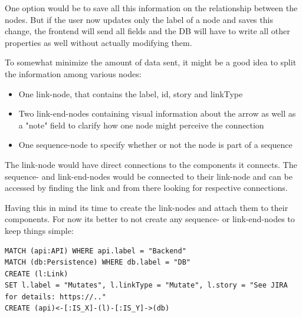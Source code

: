 One option would be to save all this information on the relationship between the nodes. But if the user now updates only the label of a node and saves this change, the frontend will send all fields and the DB will have to write all other properties as well without actually modifying them.

To somewhat minimize the amount of data sent, it might be a good idea to split the information among various nodes:
\begin{itemize}
\item One link-node, that contains the label, id, story and linkType
\item Two link-end-nodes containing visual information about the arrow as well as a "note" field to clarify how one node might perceive the connection
\item One sequence-node to specify whether or not the node is part of a sequence
\end{itemize}

The link-node would have direct connections to the components it connects. The sequence- and link-end-nodes would be connected to their link-node and can be accessed by finding the link and from there looking for respective connections.

Having this in mind its time to create the link-nodes and attach them to their components. For now its better to not create any sequence- or link-end-nodes to keep things simple:

\begin{lstlisting}[caption={Creating and Connecting the First Link}]
MATCH (api:API) WHERE api.label = "Backend"
MATCH (db:Persistence) WHERE db.label = "DB"
CREATE (l:Link)
SET l.label = "Mutates", l.linkType = "Mutate", l.story = "See JIRA for details: https://.."
CREATE (api)<-[:IS_X]-(l)-[:IS_Y]->(db)
\end{lstlisting}

